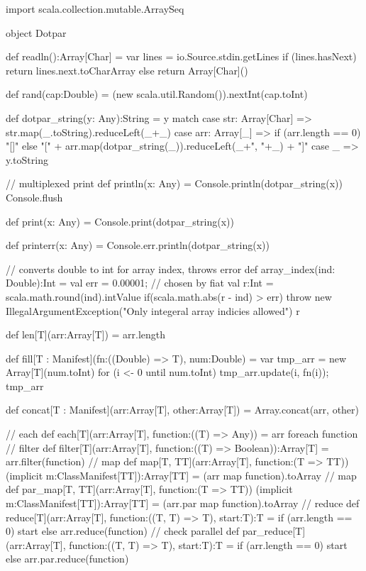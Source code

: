 import scala.collection.mutable.ArraySeq

object Dotpar {

  def readln():Array[Char] = {
    var lines = io.Source.stdin.getLines
    if (lines.hasNext)
      return lines.next.toCharArray
    else
      return Array[Char]()
  }

  def rand(cap:Double) = {
    (new scala.util.Random()).nextInt(cap.toInt)
  }

  def dotpar_string(y: Any):String = {
    y match {
      case str: Array[Char] =>
        str.map(_.toString).reduceLeft(_+_)
      case arr: Array[_] =>
        if (arr.length == 0) {
          "[]"
        } else {
          "[" + arr.map(dotpar_string(_)).reduceLeft(_+", "+_) + "]"
        }
      case _ => y.toString
    }
  }

  // multiplexed print
  def println(x: Any) = {
    Console.println(dotpar_string(x))
    Console.flush
  }

  def print(x: Any) = {
    Console.print(dotpar_string(x))
  }

  def printerr(x: Any) = {
    Console.err.println(dotpar_string(x))
  }

  // converts double to int for array index, throws error
  def array_index(ind: Double):Int = {
    val err = 0.00001; // chosen by fiat
    val r:Int = scala.math.round(ind).intValue
    if(scala.math.abs(r - ind) > err) {
      throw new IllegalArgumentException("Only integeral array indicies allowed")
    }
    r
  }

  def len[T](arr:Array[T]) = {
    arr.length
  }

  def fill[T : Manifest](fn:((Double) => T), num:Double) = {
    var tmp_arr = new Array[T](num.toInt)
    for (i <- 0 until num.toInt) {
      tmp_arr.update(i, fn(i));
    }
    tmp_arr
  }

  def concat[T : Manifest](arr:Array[T], other:Array[T]) = {
    Array.concat(arr, other)
  }

  // each
  def each[T](arr:Array[T], function:((T) => Any)) = {
    arr foreach function
  }
  // filter
  def filter[T](arr:Array[T], function:((T) => Boolean)):Array[T] = {
    arr.filter(function)
  }
  // map
  def map[T, TT](arr:Array[T], function:(T => TT))
      (implicit m:ClassManifest[TT]):Array[TT] = {
    (arr map function).toArray
  }
  // map
  def par_map[T, TT](arr:Array[T], function:(T => TT))
      (implicit m:ClassManifest[TT]):Array[TT] = {
    (arr.par map function).toArray
  }
  // reduce
  def reduce[T](arr:Array[T], function:((T, T) => T), start:T):T = {
    if (arr.length == 0) {
      start
    } else {
      arr.reduce(function)
    }
  }
  // check parallel
  def par_reduce[T](arr:Array[T], function:((T, T) => T), start:T):T = {
    if (arr.length == 0) {
      start
    } else {
      arr.par.reduce(function)
    }
  }
}
